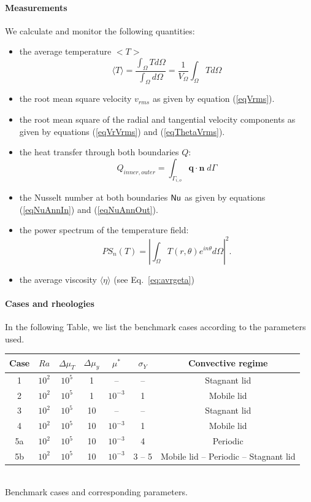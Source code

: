 \paragraph{Measurements} We calculate and monitor the following quantities:
\begin{itemize}
\item the average temperature $<T>$
\begin{equation}
\langle T \rangle = \frac{\int_\Omega T  d\Omega }{\int_\Omega d \Omega }
=\frac{1}{V_\Omega}\int_\Omega T d\Omega
\end{equation}
\item the root mean square velocity $v_{rms}$ as given by equation (\ref{eqVrms}).
\item the root mean square of the radial and tangential velocity components as given by equations (\ref{eqVrVrms}) and (\ref{eqThetaVrms}).
\item the heat transfer through both boundaries $Q$:
\begin{equation}
Q_{inner, outer} = \int_{\Gamma_{i,o}} \boldsymbol{q} \cdot \boldsymbol{{n}} \; d\Gamma 
\end{equation}
\item the Nusselt number at both boundaries ${\mathsf{Nu}}$ as given by equations (\ref{eqNuAnnIn}) and  (\ref{eqNuAnnOut}). 
\item the power spectrum of the temperature field:
\begin{equation}
PS_n(T) = \left |\int_\Omega T(r, \theta) e^{in\theta} d\Omega \right |^2.
\end{equation}
\item the average viscosity $\langle \eta \rangle$ (see Eq.~\ref{eq:avrgeta})
\end{itemize}

\paragraph{Cases and rheologies}
In the following Table, we list the benchmark cases according to the parameters used. 
\begin{center}
\begin{tabular}{c c c c c c c} 
\hline
Case & $Ra$ & $\Delta\mu_T$ & $\Delta\mu_y$ & $\mu^*$ & $\sigma_Y$ & Convective regime \\
\hline
1   & $10^2$ & $10^5$    & 1  & -- & --             & Stagnant lid    \\
2   & $10^2$ & $10^5$    & 1  & $10^{-3}$ & 1       & Mobile lid \\
3   & $10^2$ & $10^5$    & 10 & --  & --            & Stagnant lid \\
4   & $10^2$ & $10^5$    & 10 & $10^{-3}$ & 1       & Mobile lid  \\
5a  & $10^2$ & $10^5$    & 10 & $10^{-3}$ & 4       & Periodic  \\
5b  & $10^2$ & $10^5$    & 10 & $10^{-3}$ & 3 -- 5  & Mobile lid -- Periodic -- Stagnant lid \\
\hline
\end{tabular}\\
{\small Benchmark cases and corresponding parameters.} 
\end{center}

